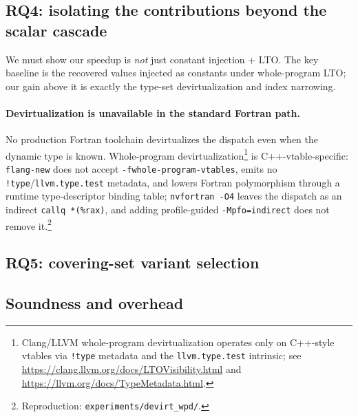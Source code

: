 \subsection{RQ4: isolating the contributions beyond the scalar cascade}
\label{sec:eval:rq4}
We must show our speedup is \emph{not} just constant injection + LTO. The key baseline is the recovered values injected as constants under whole-program LTO; our gain above it is exactly the type-set devirtualization and index narrowing.
\paragraph{Devirtualization is unavailable in the standard Fortran path.}
No production Fortran toolchain devirtualizes the dispatch even when the dynamic type is known. Whole-program devirtualization\footnote{Clang/LLVM whole-program devirtualization operates only on C++-style vtables via \texttt{!type} metadata and the \texttt{llvm.type.test} intrinsic; see \url{https://clang.llvm.org/docs/LTOVisibility.html} and \url{https://llvm.org/docs/TypeMetadata.html}.} is C++-vtable-specific: \texttt{flang-new} does not accept \texttt{-fwhole-program-vtables}, emits no \texttt{!type}/\texttt{llvm.type.test} metadata, and lowers Fortran polymorphism through a runtime type-descriptor binding table; \texttt{nvfortran -O4} leaves the dispatch as an indirect \texttt{callq *(\%rax)}, and adding profile-guided \texttt{-Mpfo=indirect} does not remove it.\footnote{Reproduction: \texttt{experiments/devirt\_wpd/}.}

\subsection{RQ5: covering-set variant selection}
\label{sec:eval:rq5}

\subsection{Soundness and overhead}
\label{sec:eval:overhead}
